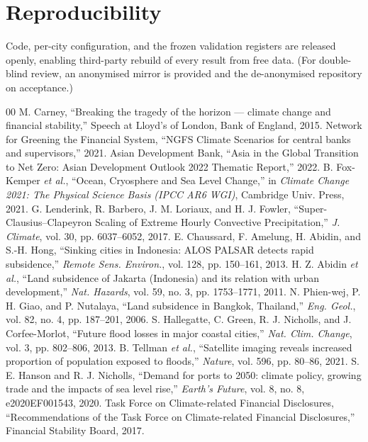 \documentclass[11pt,a4paper]{article}
\begin{document}
\section*{Reproducibility}
Code, per-city configuration, and the frozen validation registers are released openly, enabling third-party rebuild of every result from free data. (For double-blind review, an anonymised mirror is provided and the de-anonymised repository on acceptance.)

\begin{thebibliography}{00}
 M. Carney, ``Breaking the tragedy of the horizon --- climate change and financial stability,'' Speech at Lloyd's of London, Bank of England, 2015.
 Network for Greening the Financial System, ``NGFS Climate Scenarios for central banks and supervisors,'' 2021.
 Asian Development Bank, ``Asia in the Global Transition to Net Zero: Asian Development Outlook 2022 Thematic Report,'' 2022.
 B. Fox-Kemper \emph{et al.}, ``Ocean, Cryosphere and Sea Level Change,'' in \emph{Climate Change 2021: The Physical Science Basis (IPCC AR6 WGI)}, Cambridge Univ. Press, 2021.
 G. Lenderink, R. Barbero, J. M. Loriaux, and H. J. Fowler, ``Super-Clausius--Clapeyron Scaling of Extreme Hourly Convective Precipitation,'' \emph{J. Climate}, vol. 30, pp. 6037--6052, 2017.
 E. Chaussard, F. Amelung, H. Abidin, and S.-H. Hong, ``Sinking cities in Indonesia: ALOS PALSAR detects rapid subsidence,'' \emph{Remote Sens. Environ.}, vol. 128, pp. 150--161, 2013.
 H. Z. Abidin \emph{et al.}, ``Land subsidence of Jakarta (Indonesia) and its relation with urban development,'' \emph{Nat. Hazards}, vol. 59, no. 3, pp. 1753--1771, 2011.
 N. Phien-wej, P. H. Giao, and P. Nutalaya, ``Land subsidence in Bangkok, Thailand,'' \emph{Eng. Geol.}, vol. 82, no. 4, pp. 187--201, 2006.
 S. Hallegatte, C. Green, R. J. Nicholls, and J. Corfee-Morlot, ``Future flood losses in major coastal cities,'' \emph{Nat. Clim. Change}, vol. 3, pp. 802--806, 2013.
 B. Tellman \emph{et al.}, ``Satellite imaging reveals increased proportion of population exposed to floods,'' \emph{Nature}, vol. 596, pp. 80--86, 2021.
 S. E. Hanson and R. J. Nicholls, ``Demand for ports to 2050: climate policy, growing trade and the impacts of sea level rise,'' \emph{Earth's Future}, vol. 8, no. 8, e2020EF001543, 2020.
 Task Force on Climate-related Financial Disclosures, ``Recommendations of the Task Force on Climate-related Financial Disclosures,'' Financial Stability Board, 2017.

\end{thebibliography}
\end{document}
